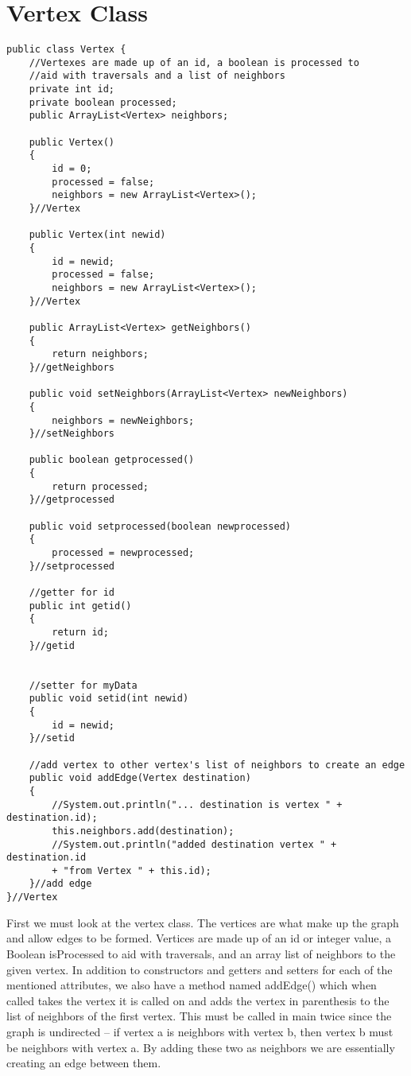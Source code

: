 \documentclass{article}
\begin{document}
\section{Vertex Class}
\begin{lstlisting}[frame =single,
backgroundcolor = \color{grey!12}]
public class Vertex {
	//Vertexes are made up of an id, a boolean is processed to 
	//aid with traversals and a list of neighbors 
	private int id;
	private boolean processed; 
	public ArrayList<Vertex> neighbors;
	
	public Vertex()
	{
		id = 0;
		processed = false;
		neighbors = new ArrayList<Vertex>();
	}//Vertex
	
	public Vertex(int newid)
	{
		id = newid;
		processed = false;
		neighbors = new ArrayList<Vertex>();
	}//Vertex
	
	public ArrayList<Vertex> getNeighbors()
	{
		return neighbors;
	}//getNeighbors
	
	public void setNeighbors(ArrayList<Vertex> newNeighbors)
	{
		neighbors = newNeighbors;
	}//setNeighbors
	
	public boolean getprocessed()
	{
		return processed;
	}//getprocessed
	
	public void setprocessed(boolean newprocessed)
	{
		processed = newprocessed;
	}//setprocessed
	
	//getter for id 
	public int getid()
	{
		return id;
	}//getid
	
	
	//setter for myData 
	public void setid(int newid)
	{
		id = newid;
	}//setid
	
	//add vertex to other vertex's list of neighbors to create an edge 
	public void addEdge(Vertex destination) 
	{
		//System.out.println("... destination is vertex " + destination.id);
		this.neighbors.add(destination);
		//System.out.println("added destination vertex " + destination.id 
		+ "from Vertex " + this.id);
	}//add edge 
}//Vertex
\end{lstlisting}
\large
First we must look at the vertex class. The vertices are what make up the graph and allow edges to be formed. Vertices are made up of an id or integer value, a Boolean isProcessed to aid with traversals, and an array list of neighbors to the given vertex. In addition to constructors and getters and setters for each of the mentioned attributes, we also have a method named addEdge() which when called takes the vertex it is called on and adds the vertex in parenthesis to the list of neighbors of the first vertex. This must be called in main twice since the graph is undirected -- if vertex a is neighbors with vertex b, then vertex b must be neighbors with vertex a. By adding these two as neighbors we are essentially creating an edge between them. 
\end{document}
